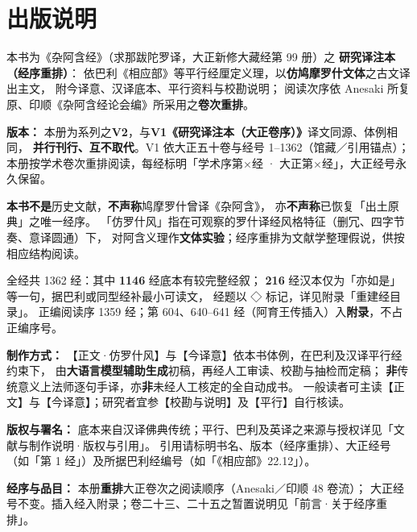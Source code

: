 
\chapter*{出版说明}

本书为《杂阿含经》（求那跋陀罗译，大正新修大藏经第 99 册）之
\textbf{研究译注本（经序重排）}：
依巴利《相应部》等平行经厘定义理，以\textbf{仿鸠摩罗什文体}之古文译出主文，
附今译意、汉译底本、平行资料与校勘说明；
阅读次序依 Anesaki 所复原、印顺《杂阿含经论会编》所采用之\textbf{卷次重排}。

\vspace{0.8em}
\noindent\textbf{版本：}
本册为系列之\textbf{V2}，与\textbf{V1《研究译注本（大正卷序）》}译文同源、体例相同，
\textbf{并行刊行、互不取代}。V1 依大正五十卷与经号 1--1362（馆藏／引用锚点）；
本册按学术卷次重排阅读，每经标明「学术序第×经 · 大正第×经」，大正经号永久保留。

\vspace{0.8em}
\noindent\textbf{本书不是}历史文献，\textbf{不声称}鸠摩罗什曾译《杂阿含》，
亦\textbf{不声称}已恢复「出土原典」之唯一经序。
「仿罗什风」指在可观察的罗什译经风格特征（删冗、四字节奏、意译圆通）下，
对阿含义理作\textbf{文体实验}；经序重排为文献学整理假说，供按相应结构阅读。

\vspace{0.8em}
\noindent 全经共 1362 经：其中 \textbf{1146} 经底本有较完整经叙；
\textbf{216} 经汉本仅为「亦如是」等一句，据巴利或同型经补最小可读文，
经题以 ◇ 标记，详见附录「重建经目录」。
正编阅读序 1359 经；第 604、640--641 经（阿育王传插入）入\textbf{附录}，不占正编序号。

\vspace{0.8em}
\noindent\textbf{制作方式：}
【正文·仿罗什风】与【今译意】依本书体例，在巴利及汉译平行经约束下，
由\textbf{大语言模型辅助生成}初稿，再经人工审读、校勘与抽检而定稿；
\textbf{非}传统意义上法师逐句手译，亦\textbf{非}未经人工核定的全自动成书。
一般读者可主读【正文】与【今译意】；研究者宜参【校勘与说明】及【平行】自行核读。

\vspace{0.8em}
\noindent\textbf{版权与署名：}
底本来自汉译佛典传统；平行、巴利及英译之来源与授权详见「文献与制作说明·版权与引用」。
引用请标明书名、版本（经序重排）、大正经号（如「第 1 经」）及所据巴利经编号（如「《相应部》22.12」）。

\vspace{0.8em}
\noindent\textbf{经序与品目：}
本册\textbf{重排}大正卷次之阅读顺序（Anesaki／印顺 48 卷流）；
大正经号不变。插入经入附录；卷二十三、二十五之暂置说明见「前言·关于经序重排」。

\clearpage
